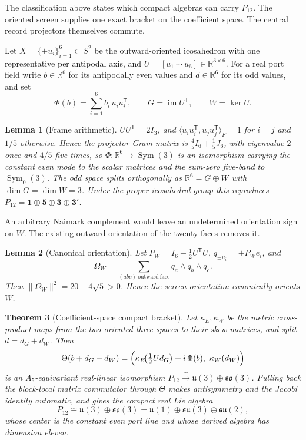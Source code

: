 \documentclass[11pt]{article}
\newtheorem{theorem}{Theorem}[section]
\newtheorem{lemma}[theorem]{Lemma}
\begin{document}
The classification above states which compact algebras can carry \(P_{12}\).
The oriented screen supplies one exact bracket on the coefficient space. The
central record projectors themselves commute.

Let \(X=\{\pm u_i\}_{i=1}^{6}\subset S^2\) be the outward-oriented icosahedron
with one representative per antipodal axis, and \(U=[u_1\ \cdots\ u_6]\in
\mathbb R^{3\times6}\). For a real port field write \(b\in\mathbb R^6\) for its
antipodally even values and \(d\in\mathbb R^6\) for its odd values, and set
\[
  \Phi(b)=\sum_{i=1}^{6}b_i\,u_iu_i^{\mathsf T},
  \qquad
  G=\operatorname{im}U^{\mathsf T},
  \qquad
  W=\ker U .
\]

\begin{lemma}[Frame arithmetic]
\(UU^{\mathsf T}=2I_3\), and
\(\langle u_iu_i^{\mathsf T},u_ju_j^{\mathsf T}\rangle_F=1\) for \(i=j\) and
\(1/5\) otherwise. Hence the projector Gram matrix is
\(\tfrac45I_6+\tfrac15J_6\), with eigenvalue \(2\) once and \(4/5\) five times,
so \(\Phi:\mathbb R^6\to\operatorname{Sym}(3)\) is an isomorphism carrying the
constant even mode to the scalar matrices and the sum-zero five-band to
\(\operatorname{Sym}_0(3)\). The odd space splits orthogonally as
\(\mathbb R^6=G\oplus W\) with \(\dim G=\dim W=3\). Under the proper icosahedral
group this reproduces \(P_{12}=\mathbf1\oplus\mathbf5\oplus\mathbf3\oplus\mathbf3'\).
\end{lemma}

An arbitrary Naimark complement would leave an undetermined orientation sign on
\(W\). The existing outward orientation of the twenty faces removes it.

\begin{lemma}[Canonical orientation]
Let \(P_W=I_6-\tfrac12U^{\mathsf T}U\), \(q_{\pm u_i}=\pm P_We_i\), and
\[
  \Omega_W=\sum_{(abc)\ \mathrm{outward\ face}}q_a\wedge q_b\wedge q_c .
\]
Then \(\lVert\Omega_W\rVert^2=20-4\sqrt5>0\). Hence the screen orientation
canonically orients \(W\).
\end{lemma}

\begin{theorem}[Coefficient-space compact bracket]
Let \(\kappa_E,\kappa_W\) be the metric cross-product maps from the two oriented
three-spaces to their skew matrices, and split \(d=d_G+d_W\). Then
\[
  \Theta(b+d_G+d_W)
  =\Bigl(\kappa_E\!\bigl(\tfrac12Ud_G\bigr)+i\,\Phi(b),\ \kappa_W(d_W)\Bigr)
\]
is an \(A_5\)-equivariant real-linear isomorphism
\(P_{12}\xrightarrow{\ \sim\ }\mathfrak u(3)\oplus\mathfrak{so}(3)\). Pulling
back the block-local matrix commutator through \(\Theta\) makes antisymmetry and
the Jacobi identity automatic, and gives the compact real Lie algebra
\[
  P_{12}\cong\mathfrak u(3)\oplus\mathfrak{so}(3)
  =\mathfrak u(1)\oplus\mathfrak{su}(3)\oplus\mathfrak{su}(2),
\]
whose center is the constant even port line and whose derived algebra has
dimension eleven.
\end{theorem}
\end{document}
